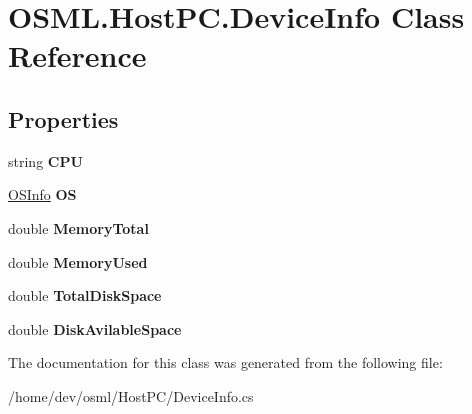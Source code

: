 \hypertarget{classOSML_1_1HostPC_1_1DeviceInfo}{}\section{O\+S\+M\+L.\+Host\+P\+C.\+Device\+Info Class Reference}
\label{classOSML_1_1HostPC_1_1DeviceInfo}
\subsection*{Properties}
\begin{DoxyCompactItemize}
\item 
\mbox{\label{classOSML_1_1HostPC_1_1DeviceInfo_a8755e1d305b8b00dd381b7f4a7a97c51}} 
string {\bfseries C\+PU}
\item 
\mbox{\label{classOSML_1_1HostPC_1_1DeviceInfo_a716e3508849ff4c2777a7751ac90a7f6}} 
\mbox{\hyperlink{classOSML_1_1HostPC_1_1OSInfo}{O\+S\+Info}} {\bfseries OS}
\item 
\mbox{\label{classOSML_1_1HostPC_1_1DeviceInfo_a4b428a461c5b8cf685547f4a3cf69de7}} 
double {\bfseries Memory\+Total}
\item 
\mbox{\label{classOSML_1_1HostPC_1_1DeviceInfo_acff5721c443f3dbbd0257f0a4f875c24}} 
double {\bfseries Memory\+Used}
\item 
\mbox{\label{classOSML_1_1HostPC_1_1DeviceInfo_a3206484e88dd64937f1f806e0b2fc6a2}} 
double {\bfseries Total\+Disk\+Space}
\item 
\mbox{\label{classOSML_1_1HostPC_1_1DeviceInfo_abf35241a75305fe7442187e2018e1356}} 
double {\bfseries Disk\+Avilable\+Space}
\end{DoxyCompactItemize}


The documentation for this class was generated from the following file\+:\begin{DoxyCompactItemize}
\item 
/home/dev/osml/\+Host\+P\+C/Device\+Info.\+cs\end{DoxyCompactItemize}
